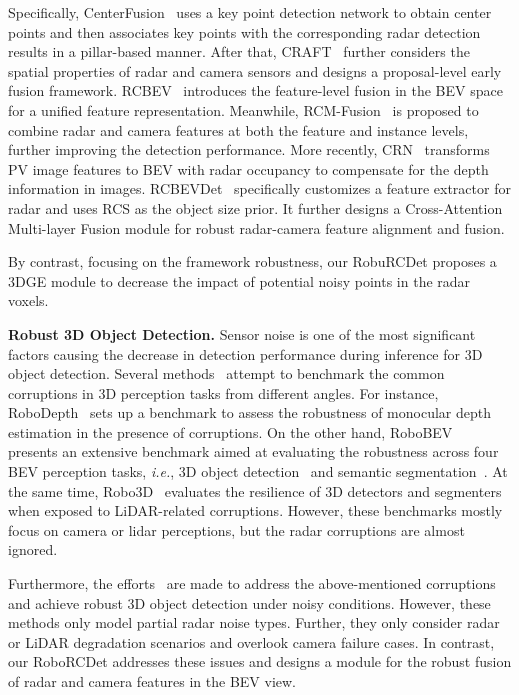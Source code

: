 Specifically, CenterFusion~\citep{centerfusion} uses a key point detection network to obtain center points and then associates key points with the corresponding radar detection results in a pillar-based manner. 
%
After that, CRAFT~\citep{craft} further considers the spatial properties of radar and camera sensors and designs a proposal-level early fusion framework.
%
RCBEV~\citep{rcbev} introduces the feature-level fusion in the BEV space for a unified feature representation. 
%
Meanwhile, RCM-Fusion~\citep{rcm} is proposed to combine radar and camera features at both the feature and instance levels, further improving the detection performance. 
%
More recently, CRN~\citep{crn} transforms PV image features to BEV with radar occupancy to compensate for the depth information in images. 
%
RCBEVDet~\citep{lin2024rcbevdet} specifically customizes a feature extractor for radar and uses RCS as the object size prior. 
%
It further designs a Cross-Attention Multi-layer Fusion module for robust radar-camera feature alignment and fusion.

By contrast, focusing on the framework robustness, our RobuRCDet proposes a 3DGE module to decrease the impact of potential noisy points in the radar voxels. 

{\flushleft \textbf{Robust 3D Object Detection.}} Sensor noise is one of the most significant factors causing the decrease in detection performance during inference for 3D object detection. 
%
Several methods~\citep{kong2023benchmarking,  kong2023robo3d, xie2023robobev, kong2023robodepth} attempt to benchmark the common corruptions in 3D perception tasks from different angles. 
For instance, RoboDepth~\citep{kong2023robodepth, ren2022benchmarking} sets up a benchmark to assess the robustness of monocular depth estimation in the presence of corruptions. On the other hand, RoboBEV~\citep{xie2023robobev} presents an extensive benchmark aimed at evaluating the robustness across four BEV perception tasks, \textit{i.e.}, 3D object detection~\citep{bevfusion, liang2022bevfusion} and semantic segmentation~\citep{zhou2022cross}.
%
At the same time, Robo3D~\citep{kong2023robo3d} evaluates the resilience of 3D detectors and segmenters when exposed to LiDAR-related corruptions. However, these benchmarks mostly focus on camera or lidar perceptions, but the radar corruptions are almost ignored.

Furthermore, the efforts~\citep{sparseinteraction, robust} are made to address the above-mentioned corruptions and achieve robust 3D object detection under noisy conditions.
%
However, these methods only model partial radar noise types. Further, they only consider radar or LiDAR degradation scenarios and overlook camera failure cases. 
%
In contrast, our RoboRCDet addresses these issues and designs a module for the robust fusion of radar and camera features in the BEV view.




